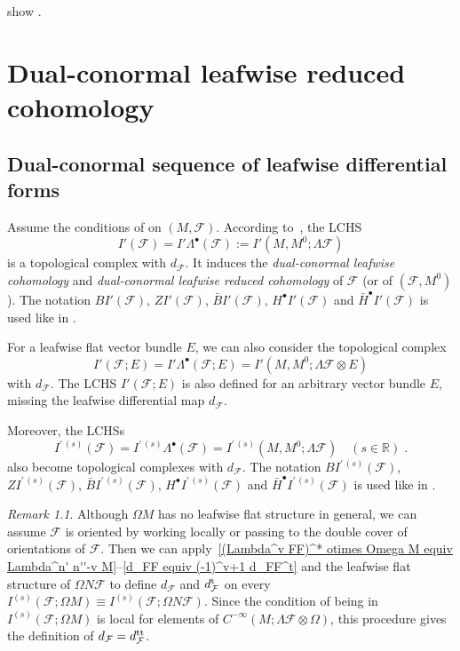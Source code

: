 \documentclass{memo-l}
\theoremstyle{plain}
\theoremstyle{definition}
\theoremstyle{remark}
\newtheorem{rem}[thm]{Remark}
\newcommand{\R}{\mathbb{R}}
\newcommand{\FF}{\mathcal{F}}
\newcommand{\trans}{{\text{\rm t}}}
\numberwithin{section}{chapter}
\numberwithin{equation}{section}%
\begin{document}
 show .





\chapter{Dual-conormal leafwise reduced cohomology}\label{ch: dual-conormal}


\section{Dual-conormal sequence of leafwise differential forms}
\label{s: dual-conormal seq of leafwise diff forms}

Assume the conditions of  on $(M,\FF)$. According to~, the LCHS \index{$I'(\FF)$}
\[
I'(\FF)=I'\Lambda^\bullet (\FF):=I'(M,M^0;\Lambda\FF)
\]
is a topological complex with $d_\FF$. It induces the \emph{dual-conormal leafwise cohomology} and \emph{dual-conormal leafwise reduced cohomology} of $\FF$ (or of $(\FF,M^0)$). The notation $BI'(\FF)$, $ZI'(\FF)$, $\bar BI'(\FF)$, $H^\bullet I'(\FF)$ \index{$H^\bullet I'(\FF)$} and $\bar H^\bullet I'(\FF)$ \index{$\bar H^\bullet I'(\FF)$} is used like in .

For a leafwise flat vector bundle $E$, we can also consider the topological complex
\[
I'(\FF;E)=I'\Lambda^\bullet(\FF;E)=I'(M,M^0;\Lambda\FF\otimes E)
\]
with $d_\FF$. The LCHS $I'(\FF;E)$ is also defined for an arbitrary vector bundle $E$, missing the leafwise differential map $d_\FF$.

Moreover, the LCHSs
\[
I^{\prime\,(s)}(\FF)=I^{\prime\,(s)}\Lambda^\bullet(\FF)=I^{\prime\,(s)}(M,M^0;\Lambda\FF)\quad(s\in\R)\;.
\]
also become topological complexes with $d_\FF$. The notation $BI^{\prime\,(s)}(\FF)$, $ZI^{\prime\,(s)}(\FF)$, $\bar BI^{\prime\,(s)}(\FF)$, $H^\bullet I^{\prime\,(s)}(\FF)$\index{$H^\bullet I^{\prime\,(s)}(\FF)$} and $\bar H^\bullet I^{\prime\,(s)}(\FF)$\index{$\bar H^\bullet I^{\prime\,(s)}(\FF)$} is used like in . 

\begin{rem}\label{r: coefficients in Omega M}
Although $\Omega M$ has no leafwise flat structure in general, we can assume $\FF$ is oriented by working locally or passing to the double cover of orientations of $\FF$. Then we can apply~\eqref{(Lambda^v FF)^* otimes Omega M equiv Lambda^n' n''-v M}--\eqref{d_FF equiv (-1)^v+1 d_FF^t} and the leafwise flat structure of $\Omega N\FF$ to define $d_\FF$ and $d_\FF^\trans$ on every $I^{(s)}(\FF;\Omega M)\equiv I^{(s)}(\FF;\Omega N\FF)$. Since the condition of being in $I^{(s)}(\FF;\Omega M)$ is local for elements of $C^{-\infty}(M;\Lambda\FF\otimes\Omega)$, this procedure gives the definition of $d_\FF=d_\FF^{\text{\rm tt}}$.
\end{rem}
\end{document}
